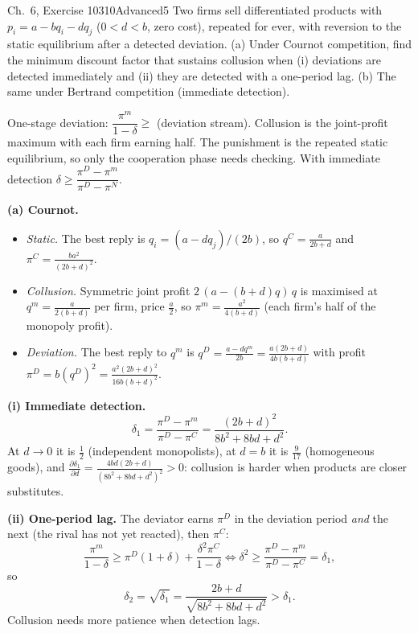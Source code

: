 \begin{exsol}{\MG{} Ch.~6, Exercise 10}{310}{Advanced}{5}
\asked Two firms sell differentiated products with $p_i = a - bq_i - dq_j$ ($0 < d < b$, zero cost), repeated
for ever, with reversion to the static equilibrium after a detected deviation. (a) Under Cournot competition,
find the minimum discount factor that sustains collusion when (i) deviations are detected immediately and (ii)
they are detected with a one-period lag. (b) The same under Bertrand competition (immediate detection).

\method One-stage deviation: $\dfrac{\pi^m}{1-\delta} \ge$ (deviation stream). Collusion is the joint-profit maximum
with each firm earning half. The punishment is the repeated static equilibrium, so only the cooperation phase
needs checking. With immediate detection $\delta \ge \dfrac{\pi^D - \pi^m}{\pi^D - \pi^N}$.

\solution
\textbf{(a) Cournot.}
\begin{itemize}
  \item \emph{Static.} The best reply is $q_i = (a - dq_j)/(2b)$, so $q^C = \frac{a}{2b+d}$ and $\pi^C = \frac{ba^2}{(2b+d)^2}$.
  \item \emph{Collusion.} Symmetric joint profit $2\,(a - (b+d)q)\,q$ is maximised at $q^m = \frac{a}{2(b+d)}$
  per firm, price $\frac a2$, so $\pi^m = \frac{a^2}{4(b+d)}$ (each firm's half of the monopoly profit).
  \item \emph{Deviation.} The best reply to $q^m$ is $q^D = \frac{a - dq^m}{2b} = \frac{a(2b+d)}{4b(b+d)}$ with
  profit $\pi^D = b(q^D)^2 = \frac{a^2(2b+d)^2}{16b(b+d)^2}$.
\end{itemize}
\textbf{(i) Immediate detection.}
\[
  \delta_1 = \frac{\pi^D - \pi^m}{\pi^D - \pi^C} = \frac{(2b+d)^2}{8b^2 + 8bd + d^2} .
\]
At $d \to 0$ it is $\frac12$ (independent monopolists), at $d = b$ it is $\frac{9}{17}$ (homogeneous goods), and
$\frac{\partial\delta_1}{\partial d} = \frac{4bd(2b+d)}{(8b^2+8bd+d^2)^2} > 0$: collusion is harder when products are
closer substitutes.

\textbf{(ii) One-period lag.} The deviator earns $\pi^D$ in the deviation period \emph{and} the next (the rival has not
yet reacted), then $\pi^C$:
\[
  \frac{\pi^m}{1-\delta} \ge \pi^D(1 + \delta) + \frac{\delta^2\pi^C}{1-\delta}
  \iff \delta^2 \ge \frac{\pi^D - \pi^m}{\pi^D - \pi^C} = \delta_1 ,
\]
so
\[
  \delta_2 = \sqrt{\delta_1} = \frac{2b+d}{\sqrt{8b^2 + 8bd + d^2}} > \delta_1 .
\]
Collusion needs more patience when detection lags.


\end{exsol}
